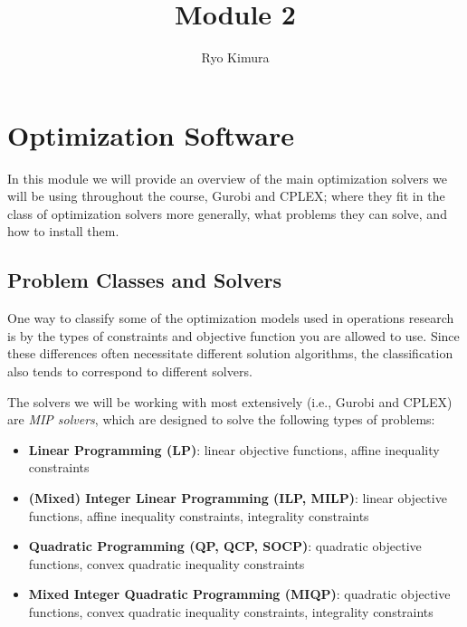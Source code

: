 \documentclass[12pt]{article}
\begin{document}
\title{Module 2}
\author{Ryo Kimura}
\maketitle

\setcounter{section}{1}
\section{Optimization Software}
In this module we will provide an overview of the main optimization solvers we will be using throughout the course, Gurobi and CPLEX; where they fit in the class of optimization solvers more generally, what problems they can solve, and how to install them.

\subsection{Problem Classes and Solvers}
One way to classify some of the optimization models used in operations research is by the types of constraints and objective function you are allowed to use.
Since these differences often necessitate different solution algorithms, the classification also tends to correspond to different solvers.

The solvers we will be working with most extensively (i.e., Gurobi and CPLEX) are \emph{MIP solvers}, which are designed to solve the following types of problems:
\begin{itemize}
    \item \textbf{Linear Programming (LP)}: linear objective functions, affine inequality constraints
    \item \textbf{(Mixed) Integer Linear Programming (ILP, MILP)}: linear objective functions, affine inequality constraints, integrality constraints
    \item \textbf{Quadratic Programming (QP, QCP, SOCP)}: quadratic objective functions, convex quadratic inequality constraints
    \item \textbf{Mixed Integer Quadratic Programming (MIQP)}: quadratic objective functions, convex quadratic inequality constraints, integrality constraints
\end{itemize}
\end{document}
